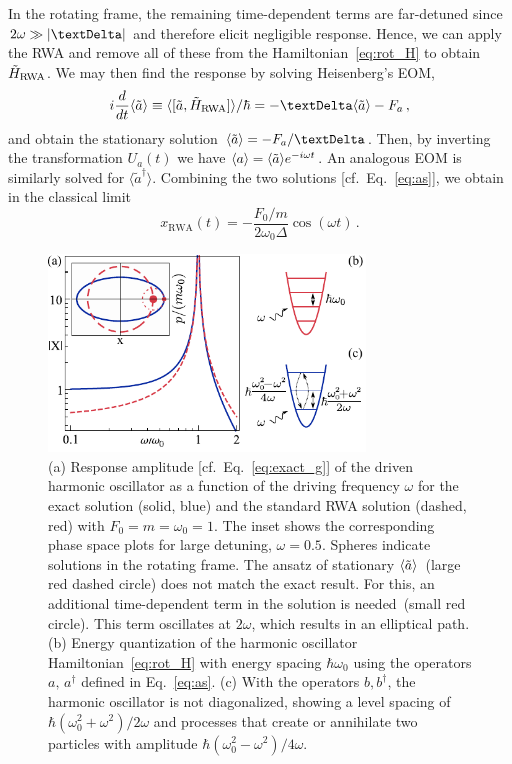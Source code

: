 In the rotating frame, the remaining time-dependent terms are far-detuned since $2\omega\gg \abs{\Delta}$ and therefore elicit negligible response. Hence, we can apply the RWA and remove all of these from the Hamiltonian~\eqref{eq:rot_H} to obtain $\tilde{H}_{\rm RWA}$. 
We may then find the response by solving Heisenberg's EOM,
\begin{equation}
i \frac{d}{dt} \etil{a} \equiv  \langle{[\tilde{a}, \tilde{H}_{\rm RWA}]}\rangle / \hbar = -\Delta \etil{a} -F_a \,,
\end{equation}
and obtain the stationary solution $\etil{a} = -F_a / \Delta$. Then, by inverting the transformation $U_a(t)$ we have $\expval{a} = \langle\tilde{a}\rangle e^{-i \omega t}$. An analogous EOM is similarly solved for $\langle \tilde{a}^\dagger \rangle$. Combining the two solutions [cf.~Eq.~\eqref{eq:as}], we obtain in the classical limit
\begin{equation} \label{eq:x_RWA}
x_{\text{RWA}}(t) = -\frac{F_0/m}{2\omega_0 \Delta} \cos(\omega t)\,.
\end{equation}

\begin{figure} [h!]
	\centering
	\includegraphics[width=0.75\textwidth]{figures/rwa/fig1.pdf}
	\caption{(a) Response amplitude [cf.~Eq.~\eqref{eq:exact_g}] of the driven harmonic oscillator as a function of the driving frequency $\omega$ for the exact solution (solid, blue) and the standard RWA solution (dashed, red) with $F_0=m=\omega_0=1$. The inset shows the corresponding phase space plots for large detuning, $\omega = 0.5$. Spheres indicate solutions in the rotating frame. The ansatz of stationary $\langle\tilde{a}\rangle$~(large red dashed circle) does not match the exact result. For this, an additional time-dependent term in the solution is needed~(small red circle). This term oscillates at $2\omega$, which results in an elliptical path.  (b) Energy quantization of the harmonic oscillator Hamiltonian~\eqref{eq:rot_H} with energy spacing $\hbar \omega_0$ using the operators $a,\,a^\dagger$ defined in Eq.~\eqref{eq:as}. (c) With the operators $b, b^\dagger$, the harmonic oscillator is not diagonalized, showing a level spacing of $\hbar (\omega_0^2+\omega^2)/ 2\omega$ and processes that create or annihilate two particles with amplitude $\hbar (\omega_0^2-\omega^2)/4\omega$.}
	\label{fig:fig1}
\end{figure}

